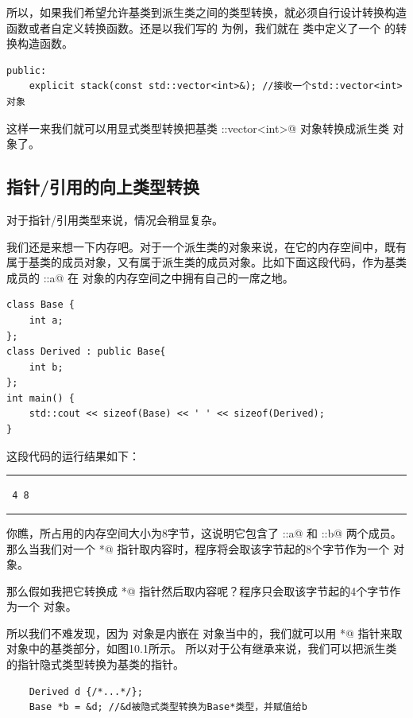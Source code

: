 所以，如果我们希望允许基类到派生类之间的类型转换，就必须自行设计转换构造函数或者自定义转换函数。还是以我们写的 \lstinline@stack@ 为例，我们就在 \lstinline@stack@ 类中定义了一个 \lstinline@explicit@ 的转换构造函数。
\begin{lstlisting}
public:
    explicit stack(const std::vector<int>&); //接收一个std::vector<int>对象
\end{lstlisting}
这样一来我们就可以用显式类型转换把基类 \lstinline@std::vector<int>@ 对象转换成派生类 \lstinline@stack@ 对象了。\par
\subsection*{指针/引用的向上类型转换}
对于指针/引用类型来说，情况会稍显复杂。\par
我们还是来想一下内存吧。对于一个派生类的对象来说，在它的内存空间中，既有属于基类的成员对象，又有属于派生类的成员对象。比如下面这段代码，作为基类成员的 \lstinline@Base::a@ 在 \lstinline@Derive@ 对象的内存空间之中拥有自己的一席之地。
\begin{lstlisting}
class Base {
    int a;
};
class Derived : public Base{
    int b;
};
int main() {
    std::cout << sizeof(Base) << ' ' << sizeof(Derived);
}
\end{lstlisting}
这段代码的运行结果如下：\\\noindent\rule{\linewidth}{.2pt}\texttt{
4 8
}\\\noindent\rule{\linewidth}{.2pt}\par
你瞧，\lstinline@Derived@ 所占用的内存空间大小为8字节，这说明它包含了 \lstinline@Base::a@ 和 \lstinline@Derived::b@ 两个成员。那么当我们对一个 \lstinline@Derived*@ 指针取内容时，程序将会取该字节起的8个字节作为一个 \lstinline@Derived@ 对象。\par
那么假如我把它转换成 \lstinline@Base*@ 指针然后取内容呢？程序只会取该字节起的4个字节作为一个 \lstinline@Base@ 对象。\par
所以我们不难发现，因为 \lstinline@Base@ 对象是内嵌在 \lstinline@Derived@ 对象当中的，我们就可以用 \lstinline@Base*@ 指针来取 \lstinline@Derived@ 对象中的基类部分，如图10.1所示。
所以对于公有继承来说，我们可以把派生类的指针隐式类型转换为基类的指针。
\begin{lstlisting}
    Derived d {/*...*/};
    Base *b = &d; //&d被隐式类型转换为Base*类型，并赋值给b
\end{lstlisting}\par
